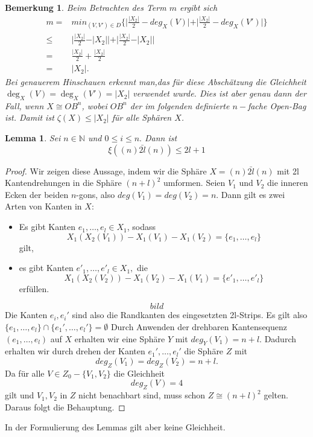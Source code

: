 \documentclass[12pt,titlepage,twoside,cleardoublepage]{article}
\theoremstyle{nummermitklammern}
\newtheorem{lemma}[temp]{Lemma}
\newtheorem{bemerkung}[temp]{Bemerkung}
\newtheorem{lemma}[zahl]{Lemma}
\newtheorem{bemerkung}[zahl]{Bemerkung}
\numberwithin{equation}{section}
\begin{document}
\begin{bemerkung}
Beim Betrachten des Term $m$ ergibt sich
\begin{align*}
m=&min_{(V,V')\in D}\{\vert\frac{\vert X_2 \vert}{2}-deg_X(V)\vert +\vert \frac{\vert X_2 \vert}{2}-deg_X(V')\vert\}\\
\leq& \vert\frac{\vert X_2 \vert}{2}-\vert X_2\vert\vert +\vert \frac{\vert X_2 \vert}{2}-\vert X_2\vert\vert \\
=&\frac{\vert X_2 \vert}{2}+\frac{\vert X_2 \vert}{2}\\
=&\vert X_2 \vert.
\end{align*}
Bei genauerem Hinschauen erkennt man,das für diese Abschätzung die Gleichheit $\deg_X(V)=\deg_X(V')=\vert X_2 \vert$ verwendet wurde. Dies ist aber genau dann der Fall, wenn $X\cong OB^{n}$, wobei $OB^{n}$ der im folgenden definierte $n-$fache Open-Bag ist. 
Damit ist $\zeta (X)\leq \vert X_2 \vert$ für alle Sphären $X$. 
\end{bemerkung}
\begin{lemma}
Sei $n\in \mathbb{N}$ und $0\leq i \leq n.$ Dann ist 
\[
\xi((n)\bar{2l}(n))\leq 2l+1
\]
\end{lemma}
\begin{proof}
Wir zeigen diese Aussage, indem wir die Sphäre $X=(n)\bar{2l}(n)$ mit 2l Kantendrehungen in die Sphäre $(n+l)^2$ umformen. Seien $V_1$ und $V_2$ die inneren Ecken der beiden $n$-gons, also $deg(V_1)=deg(V_2)=n$. Dann gilt es zwei Arten von Kanten in $X:$
\begin{itemize}
\item Es gibt Kanten $e_1,\ldots, e_l\in X_1$, sodass 
\[
X_1(X_2(V_1))-X_1(V_1)-X_1(V_2)=\{e_1,\ldots,e_l\}
\] gilt,
\item es gibt Kanten $e'_1,\ldots,e'_l\in X_1, $ die
\[
X_1(X_2(V_2))-X_1(V_2)-X_1(V_1)=\{e'_1,\ldots,e'_l\}
\] erfüllen.
\end{itemize}
\[
bild
\]
Die Kanten $e_i,e_i'$ sind also die Randkanten des eingesetzten 2l-Strips.
Es gilt also $\{e_1,\ldots,e_l\}\cap\{e_1',\ldots,e_l'\}=\emptyset$
Durch Anwenden der drehbaren Kantensequenz $(e_1,\ldots,e_l)$ auf $X$ erhalten wir eine Sphäre $Y$ mit $deg_Y(V_1)=n+l.$ Dadurch erhalten wir durch drehen der Kanten $e_1',\ldots,e_l'$ die Sphäre $Z$ mit 
\[
deg_Z(V_1)=deg_Z(V_2)=n+l.
\]
Da für alle $V\in Z_0-\{V_1,V_2\}$ die Gleichheit 
\[
deg_Z(V)=4
\]
gilt und $V_1,V_2$ in $Z$ nicht benachbart sind, muss schon $Z\cong (n+l)^2$ gelten. Daraus folgt die Behauptung.
\end{proof}
In der Formulierung des Lemmas gilt aber keine Gleichheit.
\end{document}
